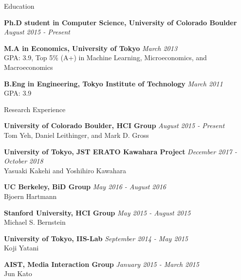 \documentclass{resume} %
\begin{document}
\begin{rSection}{Education}

{\bf Ph.D student in Computer Science, University of Colorado Boulder} \hfill {\em August 2015 - Present} 

{\bf M.A in Economics, University of Tokyo} \hfill {\em March 2013} \\
GPA: 3.9, Top 5\% (A+) in Machine Learning, Microeconomics, and Macroeconomics

{\bf B.Eng in Engineering, Tokyo Institute of Technology} \hfill {\em March 2011} \\ 
GPA: 3.9

\end{rSection}



\begin{rSection}{Research Experience}

{\bf University of Colorado Boulder, HCI Group} \hfill {\em August 2015 - Present} \\
Tom Yeh, Daniel Leithinger, and Mark D. Gross

{\bf University of Tokyo, JST ERATO Kawahara Project} \hfill {\em December 2017 - October 2018} \\
Yasuaki Kakehi and Yoshihiro Kawahara

{\bf UC Berkeley, BiD Group} \hfill {\em May 2016 - August 2016} \\
Bjoern Hartmann

{\bf Stanford University, HCI Group} \hfill {\em May 2015 - August 2015} \\
Michael S. Bernstein

{\bf University of Tokyo, IIS-Lab} \hfill {\em September 2014 - May 2015} \\
Koji Yatani

{\bf AIST, Media Interaction Group} \hfill {\em January 2015 - March 2015} \\
Jun Kato

\end{rSection}
\end{document}

